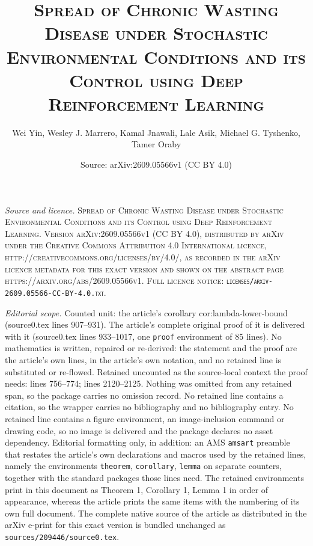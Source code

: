 \documentclass[10pt,a4paper]{amsart}
\title{\large\scshape Spread of Chronic Wasting Disease under Stochastic Environmental Conditions and its Control using Deep Reinforcement Learning}
\author{Wei Yin, Wesley J. Marrero, Kamal Jnawali, Lale Asik, Michael G. Tyshenko, Tamer Oraby}
\date{Source: arXiv:2609.05566v1 (CC BY 4.0)}
\begin{document}
\maketitle

\noindent\emph{Source and licence.} \large\scshape Spread of Chronic Wasting Disease under Stochastic Environmental Conditions and its Control using Deep Reinforcement Learning. Version arXiv:2609.05566v1 (CC BY 4.0), distributed by arXiv under the Creative Commons Attribution 4.0 International licence, http://creativecommons.org/licenses/by/4.0/, as recorded in the arXiv licence metadata for this exact version and shown on the abstract page https://arxiv.org/abs/2609.05566v1. Full licence notice: \texttt{licenses/arxiv-2609.05566-CC-BY-4.0.txt}.\par\smallskip

\noindent\textit{Editorial scope.} Counted unit: the article's corollary cor:lambda-lower-bound (source0.tex lines 907--931). The article's complete original proof of it is delivered with it (source0.tex lines 933--1017, one \texttt{proof} environment of 85 lines). No mathematics is written, repaired or re-derived: the statement and the proof are the article's own lines, in the article's own notation, and no retained line is substituted or re-flowed.  Retained uncounted as the source-local context the proof needs: lines 756--774; lines 2120--2125.  Nothing was omitted from any retained span, so the package carries no omission record.  No retained line contains a citation, so the wrapper carries no bibliography and no bibliography entry.  No retained line contains a figure environment, an image-inclusion command or drawing code, so no image is delivered and the package declares no asset dependency.  Editorial formatting only, in addition: an AMS \texttt{amsart} preamble that restates the article's own declarations and macros used by the retained lines, namely the environments \texttt{theorem}, \texttt{corollary}, \texttt{lemma} on separate counters, together with the standard packages those lines need.  The retained environments print in this document as Theorem 1, Corollary 1, Lemma 1 in order of appearance, whereas the article prints the same items with the numbering of its own full document.  The complete native source of the article as distributed in the arXiv e-print for this exact version is bundled unchanged as \texttt{sources/209446/source0.tex}.
\end{document}
